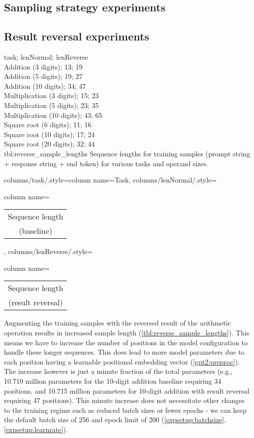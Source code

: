 \subsection{Sampling strategy experiments}
\label{setup:sampling}



\subsection{Result reversal experiments}
\label{setup:reversal}

{
	task; lenNormal; lenReverse\\
	Addition (3 digits); 13; 19 \\
	Addition (5 digits); 19; 27 \\
	Addition (10 digits); 34; 47 \\
	Multiplication (3 digits); 15; 23 \\
	Multiplication (5 digits); 23; 35 \\
	Multiplication (10 digits); 43; 65 \\
	Square root (6 digits); 11; 16 \\
	Square root (10 digits); 17; 24 \\
	Square root (20 digits); 32; 44 \\
}
{tbl:reverse_sample_lengths}
{
	Sequence lengths for training samples (prompt string + response string + end token) for various tasks and operand sizes.
}
{%
	columns/task/.style={column name={Task}},
	columns/lenNormal/.style={column name={\begin{tabular}{c} Sequence length \\ (baseline) \\ \end{tabular}}},
	columns/lenReverse/.style={column name={\begin{tabular}{c} Sequence length \\ (result reversal) \\ \end{tabular}}}
}

Augmenting the training samples with the reversed result of the arithmetic operation results in increased sample length (\cref{tbl:reverse_sample_lengths}).
This means we have to increase the number of positions in the model configuration to handle these longer sequences. This does lead to more model parameters due to each position having a learnable positional embedding vector (\cref{gpt2:preproc}). The increase however is just a minute fraction of the total parameters (e.g., 10.710 million parameters for the 10-digit addition baseline requiring 34 positions, and 10.715 million parameters for 10-digit addition with result reversal requiring 47 positions). This minute increase does not necessitate other changes to the training regime such as reduced batch sizes or fewer epochs - we can keep the default batch size of 256 and epoch limit of 200 (\cref{expsetup:batchsize}, \cref{expsetup:learnrate}).




